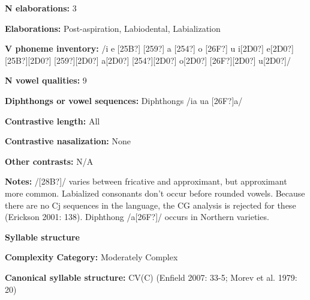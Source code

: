 \begin{styleBody}
\textbf{N elaborations:} 3
\end{styleBody}

\begin{styleBody}
\textbf{Elaborations:} Post-aspiration, Labiodental, Labialization
\end{styleBody}

\begin{styleBody}
\textbf{V phoneme inventory:} /i e [25B?] [259?] a [254?] o [26F?] u i[2D0?] e[2D0?] [25B?][2D0?] [259?][2D0?] a[2D0?] [254?][2D0?] o[2D0?] [26F?][2D0?] u[2D0?]/
\end{styleBody}

\begin{styleBody}
\textbf{N vowel qualities:} 9
\end{styleBody}

\begin{styleBody}
\textbf{Diphthongs or vowel sequences:} Diphthongs /ia ua [26F?]a/
\end{styleBody}

\begin{styleBody}
\textbf{Contrastive length:} All
\end{styleBody}

\begin{styleBody}
\textbf{Contrastive nasalization:} None
\end{styleBody}

\begin{styleBody}
\textbf{Other contrasts:} N/A
\end{styleBody}

\begin{styleBody}
\textbf{Notes: }/[28B?]/ varies between fricative and approximant, but approximant more common. Labialized consonants don’t occur before rounded vowels. Because there are no Cj sequences in the language, the CG analysis is rejected for these (Erickson 2001: 138). Diphthong /a[26F?]/ occurs in Northern varieties.
\end{styleBody}

\begin{styleBody}
\textbf{Syllable structure}
\end{styleBody}

\begin{styleBody}
\textbf{Complexity Category:} Moderately Complex
\end{styleBody}

\begin{styleBody}
\textbf{Canonical syllable structure:} CV(C)\textbf{ }(Enfield 2007: 33-5; Morev et al. 1979: 20)
\end{styleBody}

